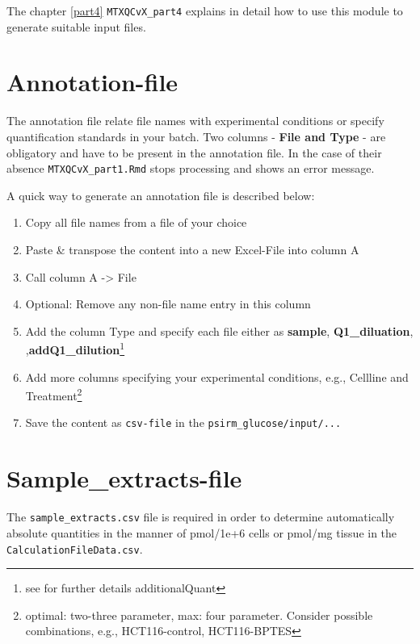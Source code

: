 \documentclass[]{book}
\providecommand{\tightlist}{%
  \setlength{\itemsep}{0pt}\setlength{\parskip}{0pt}}
\let\rmarkdownfootnote\footnote%
\def\footnote{\protect\rmarkdownfootnote}
\theoremstyle{definition}
\theoremstyle{definition}
\theoremstyle{definition}
\theoremstyle{remark}
\begin{document}
The chapter \ref{part4} \texttt{MTXQCvX\_part4} explains in detail how
to use this module to generate suitable input files.

\section{Annotation-file}\label{annotation-file}

The annotation file relate file names with experimental conditions or
specify quantification standards in your batch. Two columns -
\textbf{File and Type} - are obligatory and have to be present in the
annotation file. In the case of their absence
\texttt{MTXQCvX\_part1.Rmd} stops processing and shows an error message.

A quick way to generate an annotation file is described below:

\begin{enumerate}
\def\labelenumi{\arabic{enumi}.}
\tightlist
\item
  Copy all file names from a file of your choice
\item
  Paste \& transpose the content into a new Excel-File into column A
\item
  Call column A -\textgreater{} File
\item
  Optional: Remove any non-file name entry in this column
\item
  Add the column Type and specify each file either as \textbf{sample},
  \textbf{Q1\_diluation}, ,\textbf{addQ1\_dilution}\footnote{see for
    further details additionalQuant}
\item
  Add more columns specifying your experimental conditions, e.g.,
  Cellline and Treatment\footnote{optimal: two-three parameter, max:
    four parameter. Consider possible combinations, e.g.,
    HCT116-control, HCT116-BPTES}
\item
  Save the content as \texttt{csv-file} in the
  \texttt{psirm\_glucose/input/...}
\end{enumerate}

\section{Sample\_extracts-file}\label{sample_extracts-file}

The \texttt{sample\_extracts.csv} file is required in order to determine
automatically absolute quantities in the manner of pmol/1e+6 cells or
pmol/mg tissue in the \texttt{CalculationFileData.csv}.
\end{document}
